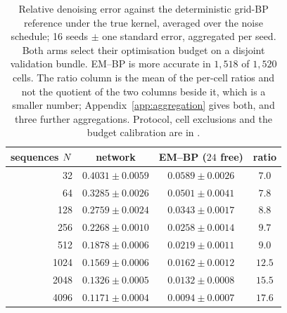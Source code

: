 
\begin{table}[!htbp]
\caption[Relative denoising error against training-set size]{Relative denoising error against the deterministic grid-BP reference under the true
kernel, averaged over the noise schedule; 16 seeds $\pm$ one standard error, aggregated
per seed. Both arms select their optimisation budget on a disjoint validation bundle. EM--BP is
more accurate in $1{,}518$ of $1{,}520$ cells. The ratio column is the mean of
the per-cell ratios and not the quotient of the two columns beside it, which is a smaller number;
Appendix~\ref{app:aggregation} gives both, and three further aggregations. Protocol, cell exclusions
and the budget calibration are in \provenanceappendix.}
\label{tab:pointwise}
\centering
\begin{tabular}{rccc}
\toprule
sequences $N$ & network & EM--BP ($24$ free) & ratio \\
\midrule
32   & $0.4031 \pm 0.0059$ & $\mathbf{0.0589 \pm 0.0026}$ & $7.0$ \\
64   & $0.3285 \pm 0.0026$ & $\mathbf{0.0501 \pm 0.0041}$ & $7.8$ \\
128  & $0.2759 \pm 0.0024$ & $\mathbf{0.0343 \pm 0.0017}$ & $8.8$ \\
256  & $0.2268 \pm 0.0010$ & $\mathbf{0.0258 \pm 0.0014}$ & $9.7$ \\
512  & $0.1878 \pm 0.0006$ & $\mathbf{0.0219 \pm 0.0011}$ & $9.0$ \\
1024 & $0.1569 \pm 0.0006$ & $\mathbf{0.0162 \pm 0.0012}$ & $12.5$ \\
2048 & $0.1326 \pm 0.0005$ & $\mathbf{0.0132 \pm 0.0008}$ & $15.5$ \\
4096 & $0.1171 \pm 0.0004$ & $\mathbf{0.0094 \pm 0.0007}$ & $17.6$ \\
\bottomrule
\end{tabular}
\end{table}
